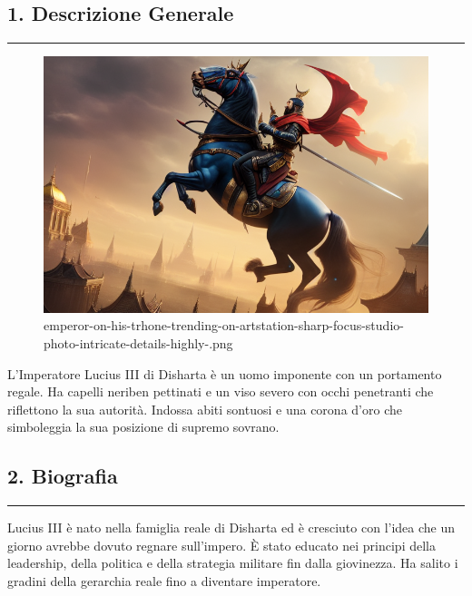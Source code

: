 \subsection{1. Descrizione Generale}\label{descrizione-generale}

\begin{center}\rule{0.5\linewidth}{0.5pt}\end{center}

\begin{figure}
\centering
\includegraphics{emperor-on-his-trhone-trending-on-artstation-sharp-focus-studio-photo-intricate-details-highly-.png}
\caption{emperor-on-his-trhone-trending-on-artstation-sharp-focus-studio-photo-intricate-details-highly-.png}
\end{figure}

L'Imperatore Lucius III di Disharta è un uomo imponente con un
portamento regale. Ha capelli neriben pettinati e un viso severo con
occhi penetranti che riflettono la sua autorità. Indossa abiti sontuosi
e una corona d'oro che simboleggia la sua posizione di supremo sovrano.

\subsection{2. Biografia}\label{biografia}

\begin{center}\rule{0.5\linewidth}{0.5pt}\end{center}

Lucius III è nato nella famiglia reale di Disharta ed è cresciuto con
l'idea che un giorno avrebbe dovuto regnare sull'impero. È stato educato
nei principi della leadership, della politica e della strategia militare
fin dalla giovinezza. Ha salito i gradini della gerarchia reale fino a
diventare imperatore.

